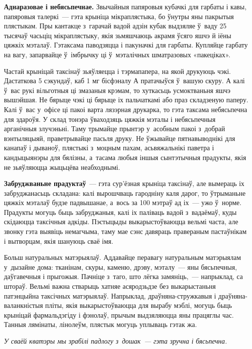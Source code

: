 \textbf{Аднаразовае і небясьпечнае.} Звычайныя папяровыя кубачкі для гарбаты і кавы, папяровыя талеркі~--- гэта крыніца мікраплястыка, бо ўнутры яны пакрытыя плястыкам. Пры кантакце з~гарачай вадой адзін кубак выдзяляе ў~ваду 25 тысячаў часьціц мікраплястыку, якія зьмяшчаюць акрамя ўсяго яшчэ й іёны цяжкіх мэталаў. Гэтаксама паводзяцца і пакуначкі для гарбаты. Купляйце гарбату на вагу, запарвайце ў~імбрычку ці ў~мэталічных шматразовых «пакеціках».

Частай крыніцай таксінаў зьяўляецца і тэрмапапера, на якой друкуюць чэкі. Дастаткова 5 сэкундаў, каб 1 мг бісфэналу А пратачыўся ў~вашую скуру. А калі ў~вас рукі вільготныя ці змазаныя крэмам, то хуткасьць усмоктваньня яшчэ вышэйшая. Не бярыце чэкі ці бярыце іх пальчаткамі або праз складзеную паперу. Калі ў~вас у~офісе ці пакоі варта лязэрная друкарка, то гэта таксама небясьпечна для здароўя. У склад тонэра ўваходзяць цяжкія мэталы і небясьпечныя арганічныя злучэньні. Таму трымайце прынтэр у~асобным пакоі з~добрай вэнтыляцыяй, праветрывайце пасьля друку. Не ўжывайце пятнавыводнікі для канапаў і дываноў, плястыкі з~моцным пахам, асьвяжальнікі паветра і кандыцыянэры для бялізны, а~тасама любыя іншыя сынтэтычныя прадукты, якія не зьяўляюцца жыцьцёва неабходнымі.

\textbf{Забруджваньне прадуктаў}~--- гэта сур'ёзная крыніца таксінаў, але вымераць іх забруджанасьць складана: калі вырошчваць гародніну каля дарог, то ўтрыманьне цяжкіх мэталаў будзе падвышанае, а~вось за 100 мэтраў ад іх~--- ужо ў~норме. Прадукты могуць быць забруджаныя, калі іх паліваць вадой з~вадаёмаў, куды скідаюцца таксічныя адкіды. Пэстыцыды выкарыстоўваюцца вельмі часта, але звонку гэта выявіць немагчыма, таму мае сэнс давяраць правераным пастаўнікам і вытворцам, якія шануюць сваё імя.

Больш натуральных матэрыялаў. Аддавайце перавагу натуральным матэрыялам у~дызайне дома: тканінам, скуры, каменю, дрэву, мэталу~--- яны бясьпечныя, даўгавечныя і прыгожыя. Пачніце з~таго, што лёгка замяніць,~--- напрыклад, са штораў. Вельмі важна стварыць хатняе асяродзьдзе без выкарыстаньня патэнцыйна таксічных матэрыялаў. Напрыклад, драўняна-стружкавыя і драўняна-валанкністыя пліты, якія выкарыстоўваюцца для вырабу мэблі, могуць быць крыніцай фармальдэгіду і фэнолаў, прычым выдзяляюцца яны працяглы час. Танныя лямінаты, лінолеўм, плястык могуць уплываць гэтак жа. 

\emph{У сваёй кватэры мы зрабілі падлогу з~дошак~--- гэта зручна і бясьпечна.}

